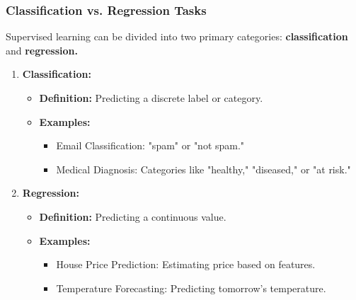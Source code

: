 \documentclass[aspectratio=169]{beamer}
\begin{document}
\begin{frame}[fragile]
    \frametitle{Classification vs. Regression Tasks}
    Supervised learning can be divided into two primary categories: \textbf{classification} and \textbf{regression.}

    \begin{enumerate}
        \item \textbf{Classification:}
            \begin{itemize}
                \item \textbf{Definition:} Predicting a discrete label or category.
                \item \textbf{Examples:}
                    \begin{itemize}
                        \item Email Classification: "spam" or "not spam."
                        \item Medical Diagnosis: Categories like "healthy," "diseased," or "at risk."
                    \end{itemize}
            \end{itemize}
        
        \item \textbf{Regression:}
            \begin{itemize}
                \item \textbf{Definition:} Predicting a continuous value.
                \item \textbf{Examples:}
                    \begin{itemize}
                        \item House Price Prediction: Estimating price based on features.
                        \item Temperature Forecasting: Predicting tomorrow's temperature.
                    \end{itemize}
            \end{itemize}
    \end{enumerate}
\end{frame}
\end{document}
